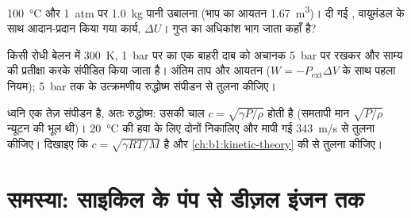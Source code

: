 \begin{exercise}[$\star\star\star$]\label{exo:b1:first-law:10}
\qty{100}{\degreeCelsius} और \qty{1}{atm} पर \qty{1.0}{kg} पानी उबालना
(भाप का आयतन \qty{1.67}{m^3})। दी गई , वायुमंडल के साथ आदान-प्रदान
किया गया कार्य, $\Delta U$। गुप्त  का अधिकांश भाग जाता कहाँ है?
\end{exercise}

\begin{exercise}[$\star\star\star$]\label{exo:b1:first-law:11}
किसी रोधी बेलन में \qty{300}{K}, \qty{1}{bar} पर  का एक 
बाहरी दाब को अचानक \qty{5}{bar} पर रखकर और साम्य की प्रतीक्षा करके संपीडित
किया जाता है। अंतिम ताप और आयतन ($W = -P_{\mathrm{ext}}\Delta V$ के साथ पहला
नियम); \qty{5}{bar} तक के उत्क्रमणीय रुद्धोष्म संपीडन से तुलना कीजिए।
\end{exercise}

\begin{exercise}[$\star\star\star$]\label{exo:b1:first-law:12}
ध्वनि एक तेज़ संपीडन है, अतः रुद्धोष्म: उसकी चाल $c = \sqrt{\gamma P/\rho}$
होती है (समतापी मान $\sqrt{P/\rho}$ न्यूटन की भूल थी)। \qty{20}{\degreeCelsius}
की हवा के लिए दोनों निकालिए और मापी गई \qty{343}{m/s} से तुलना कीजिए।
दिखाइए कि $c = \sqrt{\gamma RT/M}$ है और
\cref{ch:b1:kinetic-theory} की  से तुलना कीजिए।
\end{exercise}

\section{समस्या: साइकिल के पंप से डीज़ल इंजन तक}

